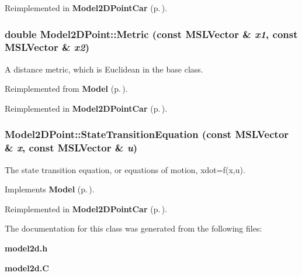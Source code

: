 Reimplemented in {\bf Model2DPoint\-Car} {\rm (p.\,\pageref{classModel2DPointCar_a2})}.
\subsubsection{\setlength{\rightskip}{0pt plus 5cm}double Model2DPoint::Metric (const {\bf MSLVector} \& {\em x1}, const {\bf MSLVector} \& {\em x2})\hspace{0.3cm}{\tt  [virtual]}}\label{classModel2DPoint_a4}


A distance metric, which is Euclidean in the base class.



Reimplemented from {\bf Model} {\rm (p.\,\pageref{classModel_a9})}.

Reimplemented in {\bf Model2DPoint\-Car} {\rm (p.\,\pageref{classModel2DPointCar_a4})}.
\subsubsection{ Model2DPoint::State\-Transition\-Equation (const {\bf MSLVector} \& {\em x}, const {\bf MSLVector} \& {\em u})\hspace{0.3cm}{\tt  [virtual]}}\label{classModel2DPoint_a3}


The state transition equation, or equations of motion, xdot=f(x,u).



Implements {\bf Model} {\rm (p.\,\pageref{classModel_a3})}.

Reimplemented in {\bf Model2DPoint\-Car} {\rm (p.\,\pageref{classModel2DPointCar_a3})}.

The documentation for this class was generated from the following files:\begin{CompactItemize}
\item 
{\bf model2d.h}\item 
{\bf model2d.C}\end{CompactItemize}
